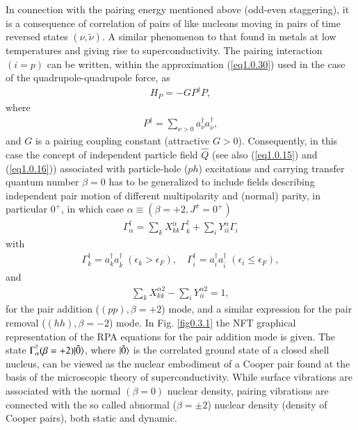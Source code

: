 In connection with the pairing energy mentioned above (odd-even staggering),  it is a consequence of correlation of pairs of like nucleons moving in pairs of time reversed states $(\nu,\tilde \nu)$. A similar phenomenon to that found in metals at low temperatures and giving rise to superconductivity. The pairing interaction $(i=p)$ can be written, within the approximation (\ref{eq1.0.30}) used in the case of the quadrupole-quadrupole force, as 
\begin{align}\label{eq1.0.32}
H_P=- GP^\dagger P,
\end{align}
where 
\begin{align}\label{eq1.0.33}
 P^\dagger=\sum_{\nu>0}a^\dagger_\nu a^\dagger_{\bar\nu},
\end{align}
and $G$ is a pairing coupling constant (attractive $G>0$).
Consequently, in this case the concept of independent particle field $\hat Q$ (see also (\ref{eq1.0.15}) and (\ref{eq1.0.16})) associated with particle-hole ($ph$) excitations and carrying transfer quantum number $\beta=0$ has to be generalized to include fields describing independent pair motion of different multipolarity and (normal) parity, in particular $0^+$, in which case $\alpha\equiv(\beta=+2,J^\pi=0^+)$
\begin{align}\label{eq1.0.34}
\Gamma^\dagger_\alpha=\sum_kX^\alpha_{kk}\Gamma_k^\dagger+\sum_iY^\alpha_{ii}\Gamma_i
\end{align}
with 
\begin{align}\label{eq1.0.35}
\Gamma^\dagger_k=a^\dagger_ka^\dagger_{\bar k}\;(\epsilon_k>\epsilon_F),\quad \Gamma^\dagger_i=a^\dagger_ia^\dagger_{\bar i}\;(\epsilon_i\leq\epsilon_F),
\end{align}
and
\begin{align}\label{eq1.0.36}
\sum_kX_{kk}^{\alpha 2}-\sum_i Y_{ii}^{\alpha 2}=1,
\end{align}
for the pair addition ($(pp),\beta=+2$) mode, and a similar expression for the pair removal ($(hh),\beta=-2$) mode. In Fig. \ref{fig0.3.1} the NFT graphical representation of the RPA equations for the pair addition mode is given. The state $\Gamma^\dagger_\alpha(\beta=+2)|{\tilde 0} \rangle$, where $|{\tilde 0} \rangle$ is the correlated ground state of a closed shell nucleus, can be viewed as the nuclear embodiment of a Cooper pair found at the basis of the microscopic theory of superconductivity.
While surface vibrations are associated with the normal $(\beta=0)$ nuclear density, pairing vibrations are connected with the so called abnormal ($\beta=\pm2$) nuclear density (density of Cooper pairs), both static and dynamic.

